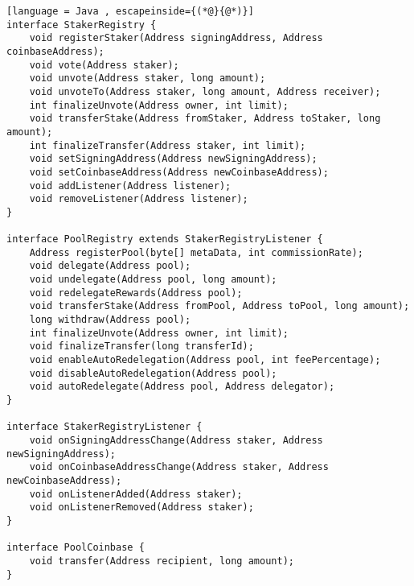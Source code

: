 \begin{lstlisting}[language = Java , escapeinside={(*@}{@*)}]
interface StakerRegistry {
    void registerStaker(Address signingAddress, Address coinbaseAddress);
    void vote(Address staker);
    void unvote(Address staker, long amount);
    void unvoteTo(Address staker, long amount, Address receiver);
    int finalizeUnvote(Address owner, int limit);
    void transferStake(Address fromStaker, Address toStaker, long amount);
    int finalizeTransfer(Address staker, int limit);
    void setSigningAddress(Address newSigningAddress);
    void setCoinbaseAddress(Address newCoinbaseAddress);
    void addListener(Address listener);
    void removeListener(Address listener);
}

interface PoolRegistry extends StakerRegistryListener {
    Address registerPool(byte[] metaData, int commissionRate);
    void delegate(Address pool);
    void undelegate(Address pool, long amount);
    void redelegateRewards(Address pool);
    void transferStake(Address fromPool, Address toPool, long amount);
    long withdraw(Address pool);
    int finalizeUnvote(Address owner, int limit);
    void finalizeTransfer(long transferId);
    void enableAutoRedelegation(Address pool, int feePercentage);
    void disableAutoRedelegation(Address pool);
    void autoRedelegate(Address pool, Address delegator);
}

interface StakerRegistryListener {
    void onSigningAddressChange(Address staker, Address newSigningAddress);
    void onCoinbaseAddressChange(Address staker, Address newCoinbaseAddress);
    void onListenerAdded(Address staker);
    void onListenerRemoved(Address staker);
}

interface PoolCoinbase {
    void transfer(Address recipient, long amount);
}

\end{lstlisting}